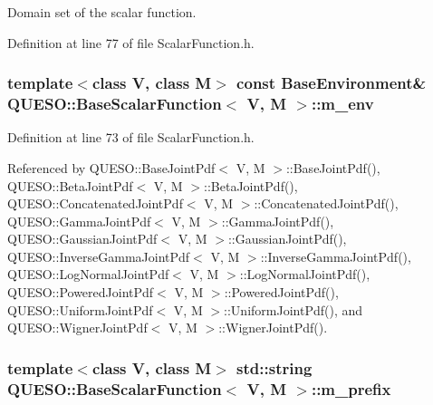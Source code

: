 Domain set of the scalar function. 



Definition at line 77 of file Scalar\-Function.\-h.

\hypertarget{class_q_u_e_s_o_1_1_base_scalar_function_adf44141aeb765d97613286f88f235f04}{
\subsubsection[{m\-\_\-env}]{\setlength{\rightskip}{0pt plus 5cm}template$<$class V, class M$>$ const {\bf Base\-Environment}\& {\bf Q\-U\-E\-S\-O\-::\-Base\-Scalar\-Function}$<$ V, M $>$\-::m\-\_\-env\hspace{0.3cm}{\ttfamily [protected]}}}\label{class_q_u_e_s_o_1_1_base_scalar_function_adf44141aeb765d97613286f88f235f04}


Definition at line 73 of file Scalar\-Function.\-h.



Referenced by Q\-U\-E\-S\-O\-::\-Base\-Joint\-Pdf$<$ V, M $>$\-::\-Base\-Joint\-Pdf(), Q\-U\-E\-S\-O\-::\-Beta\-Joint\-Pdf$<$ V, M $>$\-::\-Beta\-Joint\-Pdf(), Q\-U\-E\-S\-O\-::\-Concatenated\-Joint\-Pdf$<$ V, M $>$\-::\-Concatenated\-Joint\-Pdf(), Q\-U\-E\-S\-O\-::\-Gamma\-Joint\-Pdf$<$ V, M $>$\-::\-Gamma\-Joint\-Pdf(), Q\-U\-E\-S\-O\-::\-Gaussian\-Joint\-Pdf$<$ V, M $>$\-::\-Gaussian\-Joint\-Pdf(), Q\-U\-E\-S\-O\-::\-Inverse\-Gamma\-Joint\-Pdf$<$ V, M $>$\-::\-Inverse\-Gamma\-Joint\-Pdf(), Q\-U\-E\-S\-O\-::\-Log\-Normal\-Joint\-Pdf$<$ V, M $>$\-::\-Log\-Normal\-Joint\-Pdf(), Q\-U\-E\-S\-O\-::\-Powered\-Joint\-Pdf$<$ V, M $>$\-::\-Powered\-Joint\-Pdf(), Q\-U\-E\-S\-O\-::\-Uniform\-Joint\-Pdf$<$ V, M $>$\-::\-Uniform\-Joint\-Pdf(), and Q\-U\-E\-S\-O\-::\-Wigner\-Joint\-Pdf$<$ V, M $>$\-::\-Wigner\-Joint\-Pdf().

\hypertarget{class_q_u_e_s_o_1_1_base_scalar_function_a6e81dc902aca6a546877da99b2f4a169}{
\subsubsection[{m\-\_\-prefix}]{\setlength{\rightskip}{0pt plus 5cm}template$<$class V, class M$>$ std\-::string {\bf Q\-U\-E\-S\-O\-::\-Base\-Scalar\-Function}$<$ V, M $>$\-::m\-\_\-prefix\hspace{0.3cm}{\ttfamily [protected]}}}\label{class_q_u_e_s_o_1_1_base_scalar_function_a6e81dc902aca6a546877da99b2f4a169}


